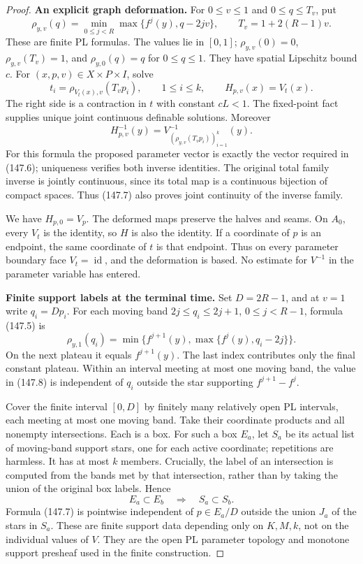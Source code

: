 \begin{proof}
\textbf{An explicit graph deformation.}\quad
For \(0\leq v\leq1\) and \(0\leq q\leq T_v\), put
\[
 \rho_{y,v}(q)=
   \min_{0\leq j<R}\max\{f^j(y),q-2jv\},
 \qquad T_v=1+2(R-1)v.
 \tag{147.5}
\]
These are finite PL formulas. The values lie in \([0,1]\);
\(\rho_{y,v}(0)=0\), \(\rho_{y,v}(T_v)=1\),
and \(\rho_{y,0}(q)=q\) for \(0\leq q\leq1\).
They have spatial Lipschitz bound \(c\).
For \((x,p,v)\in X\times P\times I\), solve
\[
 t_i=\rho_{V_t(x),v}(T_vp_i),\qquad 1\leq i\leq k,
 \qquad H_{p,v}(x)=V_t(x).
 \tag{147.6}
\]
The right side is a contraction in \(t\) with constant \(cL<1\).
The fixed-point fact supplies unique joint continuous definable
solutions. Moreover
\[
 H_{p,v}^{-1}(y)=
 V^{-1}_{(\rho_{y,v}(T_vp_i))_{i=1}^k}(y).
 \tag{147.7}
\]
For this formula the proposed parameter vector is exactly the vector
required in (147.6); uniqueness verifies both inverse identities.
The original total family inverse is jointly continuous, since its
total map is a continuous bijection of compact spaces. Thus (147.7)
also proves joint continuity of the inverse family.

We have \(H_{p,0}=V_p\). The deformed maps preserve the halves and
seams. On \(A_0\), every \(V_t\) is the identity, so \(H\) is also
the identity. If a coordinate of \(p\) is an endpoint, the same
coordinate of \(t\) is that endpoint. Thus on every parameter boundary
face \(V_t=\operatorname{id}\), and the deformation is based.
No estimate for \(V^{-1}\) in the parameter variable has entered.

\textbf{Finite support labels at the terminal time.}\quad
Set \(D=2R-1\), and at \(v=1\) write \(q_i=Dp_i\).
For each moving band
\(2j\leq q_i\leq2j+1\), \(0\leq j<R-1\), formula (147.5) is
\[
 \rho_{y,1}(q_i)=
 \min\{f^{j+1}(y),\max\{f^j(y),q_i-2j\}\}.
 \tag{147.8}
\]
On the next plateau it equals \(f^{j+1}(y)\).
The last index contributes only the final constant plateau.
Within an interval meeting at most one moving band, the value in
(147.8) is independent of \(q_i\) outside the star supporting
\(f^{j+1}-f^j\).

Cover the finite interval \([0,D]\) by finitely many relatively open
PL intervals, each meeting at most one moving band. Take their
coordinate products and all nonempty intersections. Each is a box.
For such a box \(E_a\), let \(S_a\) be its actual list of moving-band
support stars, one for each active coordinate; repetitions are harmless.
It has at most \(k\) members. Crucially, the label of an intersection
is computed from the bands met by that intersection, rather than
by taking the union of the original box labels. Hence
\[
 E_a\subset E_b\quad\Longrightarrow\quad S_a\subset S_b .
 \tag{147.9}
\]
Formula (147.7) is pointwise independent of \(p\in E_a/D\) outside
the union \(J_a\) of the stars in \(S_a\). These are finite support
data depending only on \(K,M,k\), not on the individual values of \(V\).
They are the open PL parameter topology and monotone support
presheaf used in the finite construction.


\end{proof}
